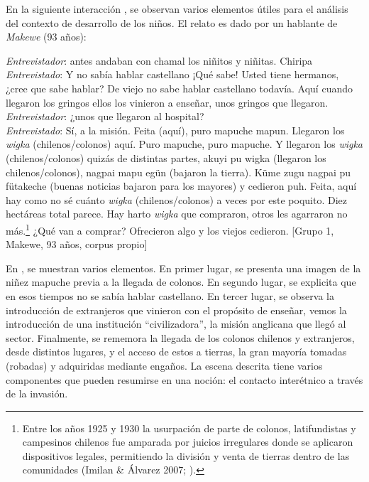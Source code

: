 \documentclass[output=paper]{../langscibook}
\begin{document}
En la siguiente interacción , se observan varios elementos útiles para el análisis del contexto de desarrollo de los niños. El relato es dado por un hablante de \textit{Makewe} (93 años):


\ea\label{ex:olate:3}
 \emph{Entrevistador}: antes andaban con chamal los niñitos y niñitas. Chiripa\\
 \emph{Entrevistado}: Y no sabía hablar castellano ¡Qué sabe! Usted tiene hermanos, ¿cree que sabe hablar? De viejo no sabe hablar castellano todavía. Aquí cuando llegaron los gringos ellos los vinieron a enseñar, unos gringos que llegaron.\\
 \emph{Entrevistador}: ¿unos que llegaron al hospital?\\
 \emph{Entrevistado}: Sí, a la misión. Feita (aquí), puro mapuche mapun. Llegaron los \textit{wigka} (chilenos/colonos) aquí. Puro mapuche, puro mapuche. Y llegaron los \textit{wigka} (chilenos/colonos) quizás de distintas partes, akuyi pu wigka (llegaron los chilenos/colonos), nagpai mapu egün (bajaron la tierra). Küme zugu nagpai pu fütakeche (buenas noticias bajaron para los mayores) y cedieron puh. Feita, aquí hay como no sé cuánto \textit{wigka} (chilenos/colonos) a veces por este poquito. Diez hectáreas total parece. Hay harto \textit{wigka} que compraron, otros les agarraron no más.\footnote{Entre los años 1925 y 1930 la usurpación de parte de colonos, latifundistas y campesinos chilenos fue amparada por juicios irregulares donde se aplicaron dispositivos legales, permitiendo la división y venta de tierras dentro de las comunidades (Imilan \& Álvarez 2007; \citealt{Bengoa2000}).} ¿Qué van a comprar? Ofrecieron algo y los viejos cedieron. \textup{[Grupo 1, Makewe, 93 años,} c\textup{orpus propio]}\\
\z

En , se muestran varios elementos. En primer lugar, se presenta una imagen de la niñez mapuche previa a la llegada de colonos. En segundo lugar, se explicita que en esos tiempos no se sabía hablar castellano. En tercer lugar, se observa la introducción de extranjeros que vinieron con el propósito de enseñar, vemos la introducción de una institución “civilizadora”, la misión anglicana que llegó al sector. Finalmente, se rememora la llegada de los colonos chilenos y extranjeros, desde distintos lugares, y el acceso de estos a tierras, la gran mayoría tomadas (robadas) y adquiridas mediante engaños. La escena descrita tiene varios componentes que pueden resumirse en una noción: el contacto interétnico a través de la invasión.
\end{document}
